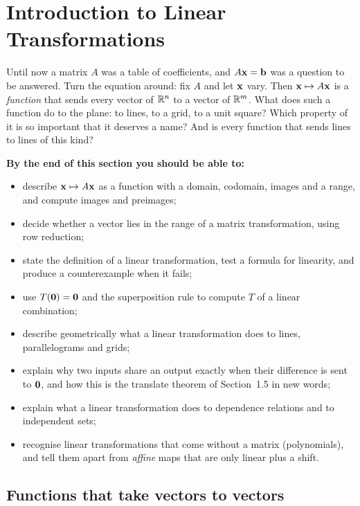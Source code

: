 \documentclass[11pt]{article}
\begin{document}
\section{Introduction to Linear Transformations}

\begin{guide}
Until now a matrix $A$ was a table of coefficients, and $A\mathbf{x}=\mathbf{b}$ was a question to be answered. Turn the equation around: fix $A$ and let $\mathbf{x}$ vary. Then $\mathbf{x}\mapsto A\mathbf{x}$ is a \emph{function} that sends every vector of $\mathbb{R}^n$ to a vector of $\mathbb{R}^m$.
What does such a function do to the plane: to lines, to a grid, to a unit square? Which property of it is so important that it deserves a name? And is every function that sends lines to lines of this kind?
\end{guide}

\textbf{By the end of this section you should be able to:}
\begin{itemize}
  \item describe $\mathbf{x}\mapsto A\mathbf{x}$ as a function with a domain, codomain, images and a range, and compute images and preimages;
  \item decide whether a vector lies in the range of a matrix transformation, using row reduction;
  \item state the definition of a linear transformation, test a formula for linearity, and produce a counterexample when it fails;
  \item use $T(\mathbf{0})=\mathbf{0}$ and the superposition rule to compute $T$ of a linear combination;
  \item describe geometrically what a linear transformation does to lines, parallelograms and grids;
  \item explain why two inputs share an output exactly when their difference is sent to $\mathbf{0}$, and how this is the translate theorem of Section~1.5 in new words;
  \item explain what a linear transformation does to dependence relations and to independent sets;
  \item recognise linear transformations that come without a matrix (polynomials), and tell them apart from \emph{affine} maps that are only linear plus a shift.
\end{itemize}

\subsection*{Functions that take vectors to vectors}
\end{document}
